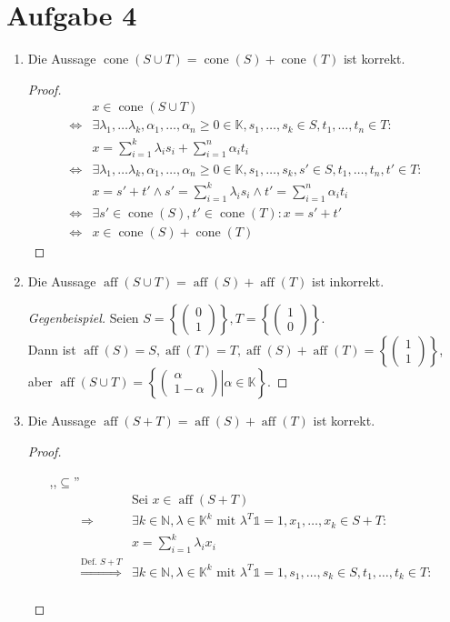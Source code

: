 \documentclass[a4paper,10pt,german]{scrartcl}
\newcommand{\gdw}{\ensuremath{\Leftrightarrow}}
\newcommand{\dann}{\ensuremath{\Rightarrow}}
\newcommand{\K}{\ensuremath{\mathbb{K}}}
\newcommand{\N}{\ensuremath{\mathbb{N}}}
\newcommand{\one}{\ensuremath{{\mathds{1}}}}
\newcommand{\divec}[2]{\ensuremath{\left(\begin{array}{cc}
                                    #1\\
                                    #2
                                   \end{array}\right)
                                   }}
\DeclareMathOperator*{\cone}{cone}
\DeclareMathOperator*{\aff}{aff}
\newenvironment{ggbsp}{\begin{proof}[Gegenbeispiel]}{ \end{proof}}
\begin{document}
\section*{Aufgabe 4}
\begin{enumerate}
 \item Die Aussage $\cone(S\cup T)=\cone(S)+\cone(T)$ ist korrekt.
  \begin{proof}
   \begin{align*}
    &x\in\cone(S\cup T)\\
    \gdw&\exists \lambda_1,\dots\lambda_k,\alpha_1,\dots,\alpha_n\geq0\in\mathbb{K},s_1,\dots,s_k\in S,t_1,\dots,t_n\in T:\\ 
    &x=\sum\limits_{i=1}^k\lambda_is_i+\sum\limits_{i=1}^n\alpha_it_i\\
    \gdw&\exists \lambda_1,\dots\lambda_k,\alpha_1,\dots,\alpha_n\geq0\in\mathbb{K},s_1,\dots,s_k,s'\in S,t_1,\dots,t_n,t'\in T:\\ 
    &x=s'+t'\wedge s'=\sum\limits_{i=1}^k\lambda_is_i\wedge t'=\sum\limits_{i=1}^n\alpha_it_i\\
    \gdw&\exists  s'\in\cone(S),t'\in\cone(T): x=s'+t'\\
    \gdw&x\in\cone(S)+\cone(T)
   \end{align*}
  \end{proof}
 \item Die Aussage $\aff(S\cup T)= \aff(S)+\aff(T)$ ist inkorrekt.
  \begin{ggbsp}
   Seien $S=\left\{\divec{0}{1}\right\},T=\left\{\divec{1}{0}\right\}$.\\
   Dann ist $\aff(S)=S,\aff(T)=T,\aff(S)+\aff(T)=\left\{\divec{1}{1}\right\}$,\\
   aber $\aff(S\cup T)=\left.\left\{\divec{\alpha}{1-\alpha}\right|\alpha\in\K\right\}$.
  \end{ggbsp}
 \item Die Aussage $\aff(S+T)= \aff(S)+\aff(T)$ ist korrekt.
  \begin{proof}
   \begin{itemize}
    \item[{,,$\subseteq$}'']
     \begin{align*}
      &\text{Sei }x\in\aff(S+T)\\ 
      \dann&\exists k\in\N,\lambda\in \K^k\text{ mit }\lambda^T\one=1,x_1,\dots,x_k\in S+T:\\
      &x=\sum\limits_{i=1}^k\lambda_i x_i\\
      \stackrel{\text{Def. }S+T}{\dann}&\exists k\in\N,\lambda\in \K^k\text{ mit }\lambda^T\one=1, s_1,\dots,s_k\in S,t_1,\dots,t_k\in T:\\

\end{align*}
\end{itemize}
\end{proof}
\end{enumerate}
\end{document}
